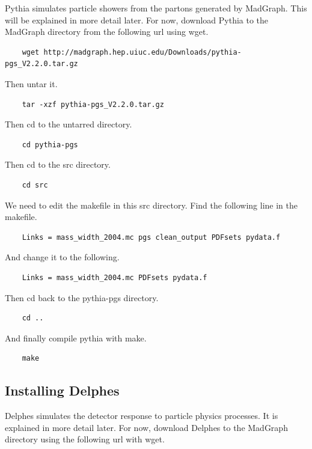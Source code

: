 \documentclass{article}
\begin{document}
Pythia simulates particle showers from the partons generated by MadGraph.
This will be explained in more detail later. For now, download Pythia to the
MadGraph directory from the following url using wget.

\begin{verbatim}
	wget http://madgraph.hep.uiuc.edu/Downloads/pythia-pgs_V2.2.0.tar.gz
\end{verbatim}

Then untar it.

\begin{verbatim}
	tar -xzf pythia-pgs_V2.2.0.tar.gz
\end{verbatim}

Then cd to the untarred directory.

\begin{verbatim}
	cd pythia-pgs
\end{verbatim}

Then cd to the src directory.

\begin{verbatim}
	cd src
\end{verbatim}

We need to edit the makefile in this src directory. Find the following line in the makefile.

\begin{verbatim}
	Links = mass_width_2004.mc pgs clean_output PDFsets pydata.f
\end{verbatim}

And change it to the following.

\begin{verbatim}
	Links = mass_width_2004.mc PDFsets pydata.f
\end{verbatim}

Then cd back to the pythia-pgs directory.

\begin{verbatim}
	cd ..
\end{verbatim}

And finally compile pythia with make.

\begin{verbatim}
	make
\end{verbatim}

\subsection{Installing Delphes}

Delphes simulates the detector response to particle physics processes. It
is explained in more detail later. For now, download Delphes to the MadGraph
directory using the following url with wget.
\end{document}
